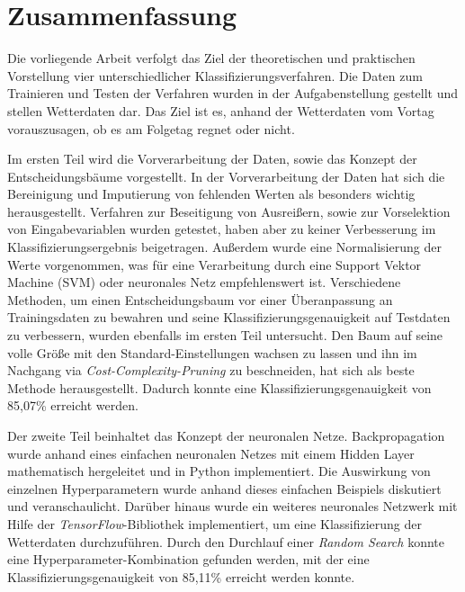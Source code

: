 \pagebreak
\section*{Zusammenfassung}
Die vorliegende Arbeit verfolgt das Ziel der theoretischen und praktischen Vorstellung vier unterschiedlicher Klassifizierungsverfahren. Die Daten zum Trainieren und Testen der Verfahren wurden in der Aufgabenstellung gestellt und stellen Wetterdaten dar. Das Ziel ist es, anhand der Wetterdaten vom Vortag vorauszusagen, ob es am Folgetag regnet oder nicht.

\noindent \hspace*{7mm}
Im ersten Teil wird die Vorverarbeitung der Daten, sowie das Konzept der Entscheidungsbäume vorgestellt. In der Vorverarbeitung der Daten hat sich die Bereinigung und Imputierung von fehlenden Werten als besonders wichtig herausgestellt. Verfahren zur Beseitigung von Ausreißern, sowie zur Vorselektion von Eingabevariablen wurden getestet, haben aber zu keiner Verbesserung im Klassifizierungsergebnis beigetragen. Außerdem wurde eine Normalisierung der Werte vorgenommen, was für eine Verarbeitung durch eine Support Vektor Machine (SVM) oder neuronales Netz empfehlenswert ist. Verschiedene Methoden, um einen Entscheidungsbaum vor einer Überanpassung an Trainingsdaten zu bewahren und seine Klassifizierungsgenauigkeit auf Testdaten zu verbessern, wurden ebenfalls im ersten Teil untersucht.  Den Baum auf seine volle Größe mit den Standard-Einstellungen wachsen zu lassen und ihn im Nachgang via \emph{Cost-Complexity-Pruning} zu beschneiden, hat sich als beste Methode herausgestellt. Dadurch konnte eine Klassifizierungsgenauigkeit von 85,07\% erreicht werden.

\noindent \hspace*{7mm}
Der zweite Teil beinhaltet das Konzept der neuronalen Netze. Backpropagation wurde anhand eines einfachen neuronalen Netzes mit einem Hidden Layer mathematisch hergeleitet und in Python implementiert. Die Auswirkung von einzelnen Hyperparametern wurde anhand dieses einfachen Beispiels diskutiert und veranschaulicht. Darüber hinaus wurde ein weiteres neuronales Netzwerk mit Hilfe der \emph{TensorFlow}-Bibliothek implementiert, um eine Klassifizierung der Wetterdaten durchzuführen. Durch den Durchlauf einer \emph{Random Search} konnte eine Hyperparameter-Kombination gefunden werden, mit der eine Klassifizierungsgenauigkeit von 85,11\% erreicht werden konnte.

